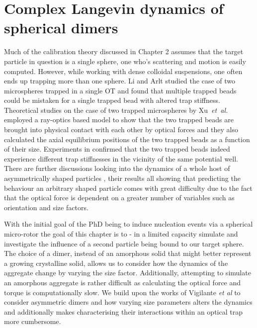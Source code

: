 \chapter{Complex Langevin dynamics of spherical dimers}
\label{chapter:langevin_dynamics}
Much of the calibration theory discussed in Chapter 2 assumes that the
target particle in question is a single sphere, one who's scattering and 
motion is easily computed. However, while working with dense colloidal 
suspensions, one often ends up trapping more than one sphere. Li and 
Arlt \cite{Li2008} studied the case of two microspheres trapped in a single 
OT and found that multiple trapped beads could be mistaken for a single 
trapped bead with altered trap stiffness. Theoretical studies on the case 
of two trapped microspheres by Xu~\textit{et~al.} \cite{Xu2005} employed a 
ray-optics based model to show that the two trapped beads are brought into 
physical contact with each other by optical forces and they also calculated 
the axial equilibrium positions of the two trapped beads as a function of 
their size. Experiments in \cite{Praveen2016} confirmed that the two trapped 
beads indeed experience different trap stiffnesses in the vicinity of the 
same potential well. There are further discussions looking into the dynamics 
of a whole host of asymmetrically shaped particles \cite{Loudet2014, ShengHua2005, 
Chetana2022}, their results all showing that predicting the behaviour an 
arbitrary shaped particle comes with great difficulty due to the fact that 
the optical force is dependent on a greater number of variables such as 
orientation and size factors.

With the initial goal of the PhD being to induce nucleation events via a 
spherical micro-rotor the goal of this chapter is to - in a limited capacity
simulate and investigate the influence of a second particle being bound to our 
target sphere. The choice of a dimer, instead of an amorphous solid that 
might better represent a growing crystalline solid, allows us to consider 
how the dynamics of the aggregate change by varying the size factor. 
Additionally, attempting to simulate an amorphous aggregate is rather difficult 
as calculating the optical force and torque is computationally slow. We build 
upon the works of Vigilante \textit{et al} \cite{Vigilante2020} to consider 
asymmetric dimers and how varying size parameters alters the dynamics and 
additionally makes characterising their interactions within an optical trap 
more cumbersome. 

